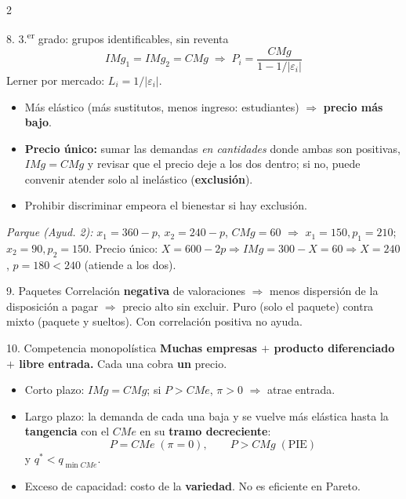 \documentclass[10pt]{article}
\begin{document}
\begin{multicols}{2}
\begin{caja}{8. 3.\textsuperscript{er} grado: grupos identificables, sin reventa}
\[
IMg_1 = IMg_2 = CMg \;\Rightarrow\; P_i = \frac{CMg}{1 - 1/|\varepsilon_i|}
\]
Lerner por mercado: $L_i = 1/|\varepsilon_i|$.
\begin{itemize}
\item Más elástico (más sustitutos, menos ingreso: estudiantes) $\Rightarrow$ \textbf{precio más bajo}.
\item \textbf{Precio único:} sumar las demandas \emph{en cantidades} donde ambas son positivas, $IMg = CMg$ y revisar que el precio deje a los dos dentro; si no, puede convenir atender solo al inelástico (\textbf{exclusión}).
\item Prohibir discriminar empeora el bienestar si hay exclusión.
\end{itemize}
\textit{Parque (Ayud. 2):} $x_1 = 360 - p$, $x_2 = 240 - p$, $CMg = 60$ $\Rightarrow$ $x_1 = 150, p_1 = 210$; $x_2 = 90, p_2 = 150$. Precio único: $X = 600 - 2p \Rightarrow IMg = 300 - X = 60 \Rightarrow X = 240$, $p = 180 < 240$ (atiende a los dos).
\end{caja}

\begin{caja}{9. Paquetes}
Correlación \textbf{negativa} de valoraciones $\Rightarrow$ menos dispersión de la disposición a pagar $\Rightarrow$ precio alto sin excluir. Puro (solo el paquete) contra mixto (paquete y sueltos). Con correlación positiva no ayuda.
\end{caja}

\begin{caja}{10. Competencia monopolística}
\textbf{Muchas empresas $+$ producto diferenciado $+$ libre entrada.} Cada una cobra \textbf{un} precio.
\begin{itemize}
\item Corto plazo: $IMg = CMg$; si $P > CMe$, $\pi > 0$ $\Rightarrow$ atrae entrada.
\item Largo plazo: la demanda de cada una baja y se vuelve más elástica hasta la \textbf{tangencia} con el $CMe$ en su \textbf{tramo decreciente}:
\[
P = CMe \;(\pi = 0), \qquad P > CMg \;(\text{PIE})
\]
y $q^* < q_{\min CMe}$.
\item Exceso de capacidad: costo de la \textbf{variedad}. No es eficiente en Pareto.
\end{itemize}
\end{caja}


\end{multicols}
\end{document}

